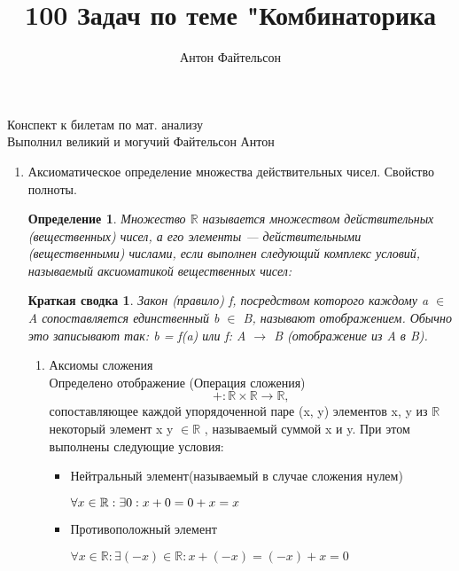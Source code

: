 \documentclass[a4paper,14pt]{extreport} %
\title{100 Задач по теме "Комбинаторика}
\author{Антон Файтельсон}
\date{}
\newtheorem{definition}{Определение}
\newtheorem*{Help}{Краткая сводка}
\begin{document}
\begin{flushleft}
	\Large  Конспект к билетам по мат. анализу	\\
	Выполнил великий и могучий Файтельсон Антон
\end{flushleft}

\begin{center}
	\begin{enumerate}
		\item Аксиоматическое определение множества действительных чисел. Свойство полноты.\\
		\begin{definition}\label{Аксиоматика}
			Множество $\mathbb {R} $ называется множеством действительных (вещественных) чисел, а его элементы — действительными (вещественными) числами, если выполнен следующий комплекс условий, называемый
			аксиоматикой вещественных чисел:
		\end{definition}
		\begin{Help}
			Закон (правило) f, посредством которого каждому a $\in$ A сопоставляется единственный b $\in$ B, называют отображением. Обычно это записывают так: b = f(a) или f: A $\rightarrow$ B (отображение из A в B). 
		\end{Help}
		\begin{enumerate}[label=(\Roman*)]
			\item Аксиомы сложения\\
			
			Определено отображение (Операция сложения)
			\begin{equation}
				+: \mathbb {R} \times \mathbb {R} \rightarrow \mathbb {R},
			\end{equation}
			сопоставляющее каждой упорядоченной паре (x, y) элементов x, y из $\mathbb {R}$
			некоторый элемент x  y $\in \mathbb {R}$ , называемый суммой x и y. При этом выполнены следующие условия:
	
			\begin{itemize}
				\item Нейтральный элемент(называемый в случае сложения нулем)
				\begin{center}
					$\forall x \in \mathbb{R}: \exists\space0: x+0=0+x=x$
				\end{center}
				
				\item Противоположный элемент
				\begin{center}
					$\forall x \in \mathbb{R}: \exists (-x) \in \mathbb{R}: x+(-x)=(-x)+x=0$
				\end{center}
				

\end{itemize}
\end{enumerate}
\end{enumerate}
\end{center}
\end{document}
